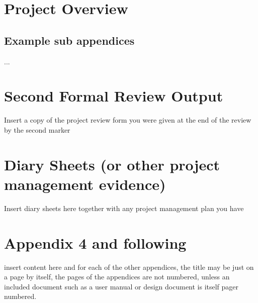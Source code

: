 \documentclass[12pt,a4paper]{article}
\begin{document}
\newpage
\begin{appendices}
\section{Project Overview}

\begin{subappendices}
\subsection{Example sub appendices}
...
\end{subappendices}

\section{Second Formal Review Output}
Insert a copy of the project review form you were given at the end of the review by the second marker

\section{Diary Sheets (or other project management evidence)}
Insert diary sheets here together with any project management plan you have

\section{Appendix 4 and following}
insert content here and for each of the other appendices, the title may be just on a page by itself, the pages of the appendices are not numbered, unless an included document such as a user manual or design document is itself pager numbered.
\end{appendices}
\end{document}

